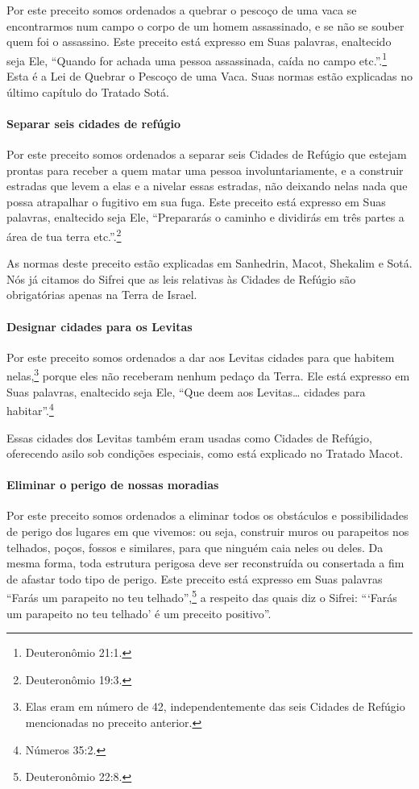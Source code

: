 Por este preceito somos ordenados a quebrar o pescoço de uma vaca se
encontrarmos num campo o corpo de um homem assassinado, e se não se
souber quem foi o assassino. Este preceito está expresso em Suas
palavras, enaltecido seja Ele, ``Quando for achada uma pessoa
assassinada, caída no campo etc.''.\footnote{Deuteronômio 21:1.} Esta é a Lei de
Quebrar o Pescoço de uma Vaca. Suas normas estão explicadas no último
capítulo do Tratado Sotá.

\paragraph{Separar seis cidades de refúgio}

Por este preceito somos ordenados a separar seis Cidades de Refúgio que
estejam prontas para receber a quem matar uma pessoa involuntariamente,
e a construir estradas que levem a elas e a nivelar essas estradas, não
deixando nelas nada que possa atrapalhar o fugitivo em sua fuga. Este
preceito está expresso em Suas palavras, enaltecido seja Ele,
``Prepararás o caminho e dividirás em três partes a área de tua terra
etc.''.\footnote{Deuteronômio 19:3.}

As normas deste preceito estão explicadas em Sanhedrin, Macot, Shekalim
e Sotá. Nós já citamos do Sifrei que as leis relativas às Cidades de
Refúgio são obrigatórias apenas na Terra de Israel.

\paragraph{Designar cidades para os Levitas}

Por este preceito somos ordenados a dar aos Levitas cidades para que
habitem nelas,\footnote{Elas eram em número de 42, independentemente das seis Cidades de
Refúgio mencionadas no preceito anterior.} porque eles não receberam nenhum
pedaço da Terra. Ele está expresso em Suas palavras, enaltecido seja
Ele, ``Que deem aos Levitas\ldots{} cidades para habitar''.\footnote{Números 35:2.}

Essas cidades dos Levitas também eram usadas como Cidades de Refúgio,
oferecendo asilo sob condições especiais, como está explicado no Tratado
Macot.

\paragraph{Eliminar o perigo de nossas moradias}

Por este preceito somos ordenados a eliminar todos os obstáculos e
possibilidades de perigo dos lugares em que vivemos: ou seja, construir
muros ou parapeitos nos telhados, poços, fossos e similares, para que
ninguém caia neles ou deles. Da mesma forma, toda estrutura perigosa
deve ser reconstruída ou consertada a fim de afastar todo tipo de
perigo. Este preceito está expresso em Suas palavras ``Farás um
parapeito no teu telhado'',\footnote{Deuteronômio 22:8.}
a respeito das quais diz o Sifrei: ```Farás um parapeito no teu telhado'
é um preceito positivo''.

